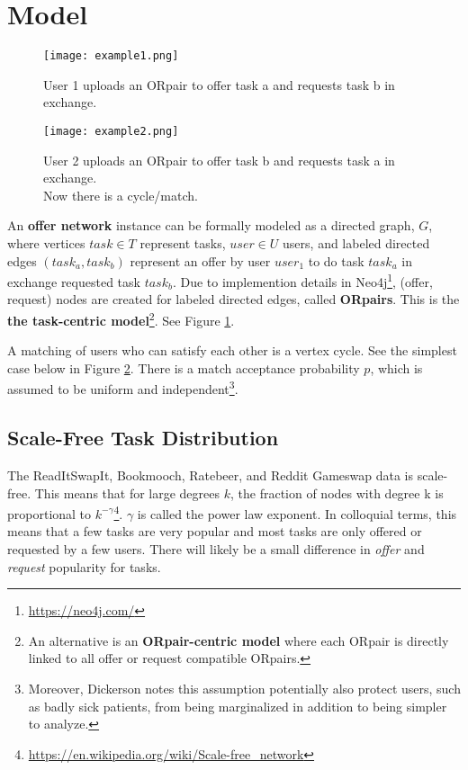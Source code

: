 \documentclass[main.tex]{subfiles}
\begin{document}
\section{Model}

\begin{figure}
  \texttt{[image: example1.png]}
  \caption{User 1 uploads an ORpair to offer task a and requests task b in exchange.}
  \label{example1}
\end{figure}

\begin{figure}
  \texttt{[image: example2.png]}
  \caption{User 2 uploads an ORpair to offer task b and requests task a in exchange.
           \\Now there is a cycle/match.}
  \label{example2}
\end{figure}

An \textbf{offer network} instance can be formally modeled as a directed graph, $G$, where vertices $task \in T$ represent tasks, $user \in U$ users, and labeled directed edges $(task_a,task_b)$ represent an offer by user $user_1$ to do task $task_a$ in exchange requested task $task_b$. Due to implemention details in Neo4j\footnote{\url{https://neo4j.com/}}, (offer, request) nodes are created for labeled directed edges, called \textbf{ORpairs}. This is the \textbf{the task-centric model}\footnote{An alternative is an \textbf{ORpair-centric model} where each ORpair is directly linked to all offer or request compatible ORpairs.}.  See Figure \ref{example1}.

A matching of users who can satisfy each other is a vertex cycle. See the simplest case below in Figure \ref{example2}. There is a match acceptance probability $p$, which is assumed to be uniform and independent\footnote{Moreover, Dickerson \cite{Dick} notes this assumption potentially also protect users, such as badly sick patients, from being marginalized in addition to being simpler to analyze.}.

\subsection{Scale-Free Task Distribution}
The ReadItSwapIt, Bookmooch, Ratebeer, and Reddit Gameswap data is scale-free. This means that for large degrees $k$, the fraction of nodes with degree k is proportional to $k^{-\gamma}$\footnote{\url{https://en.wikipedia.org/wiki/Scale-free_network}}. $\gamma$ is called the power law exponent. In colloquial terms, this means that a few tasks are very popular and most tasks are only offered or requested by a few users. There will likely be a small difference in \textit{offer} and \textit{request} popularity for tasks.
\end{document}
